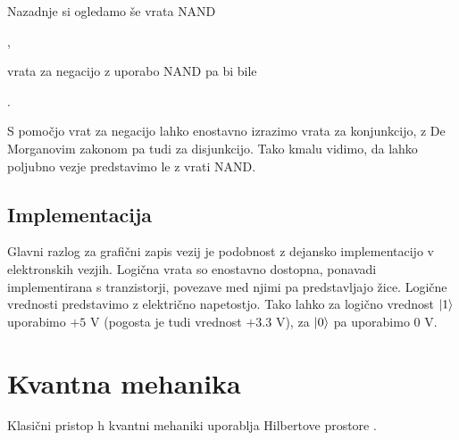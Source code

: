 \documentclass[mat1]{fmfdelo}
\begin{document}
Nazadnje si ogledamo še vrata \textsf{NAND}
\begin{center}
    ,
\end{center}
vrata za negacijo z uporabo \textsf{NAND} pa bi bile
\begin{center}
    .
\end{center}
S pomočjo vrat za negacijo lahko enostavno izrazimo vrata za konjunkcijo, z De Morganovim zakonom pa tudi za disjunkcijo. Tako kmalu vidimo, da lahko poljubno vezje predstavimo le z vrati \textsf{NAND}.

\subsection{Implementacija}
Glavni razlog za grafični zapis vezij je podobnost z dejansko implementacijo v elektronskih vezjih. Logična vrata so enostavno dostopna, ponavadi implementirana s tranzistorji, povezave med njimi pa predstavljajo žice. Logične vrednosti predstavimo z električno napetostjo. Tako lahko za logično vrednost \(\ket1\) uporabimo \(+5\) V (pogosta je tudi vrednost \(+3.3\) V), za \(\ket0\) pa uporabimo \(0\) V.


\section{Kvantna mehanika}
Klasični pristop h kvantni mehaniki uporablja Hilbertove prostore \cite[stran 12]{mathforqm}.
\end{document}
